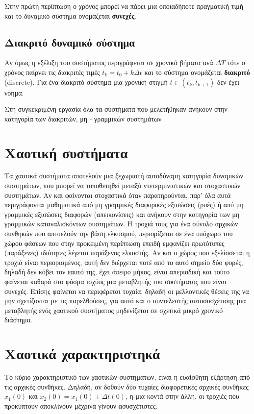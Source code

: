 Στην πρώτη περίπτωση ο χρόνος μπορεί να πάρει μια οποιαδήποτε πραγματική τιμή και το δυναμικό σύστημα ονομάζεται \textbf{συνεχές}.\cite{b2}

\subsection{Διακριτό δυναμικό σύστημα}
Αν όμως η εξέλιξη του συστήματος περιγράφεται σε χρονικά βήματα ανά $ΔT$ τότε ο χρόνος παίρνει τις διακριτές τιμές $t_k = t_0 + kΔt$ και το σύστημα ονομάζεται \textbf{διακριτό} (discrete). 
Για ένα διακριτό σύστημα μια χρονική στιγμή $t \in(t_k,t_{k+1}) $ δεν έχει νόημα.\cite{b2}



Στη συγκεκριμένη εργασία όλα τα συστήματα που μελετήθηκαν ανήκουν στην κατηγορία των διακριτών, μη - γραμμικών συστημάτων

\clearpage

\section{Χαοτική συστήματα}

Τα χαοτικά συστήματα αποτελούν μια ξεχωριστή αυτοδύναμη κατηγορία δυναμικών συστημάτων, που μπορεί να τοποθετηθεί μεταξύ ντετερμινιστικών και στοχαστικών συστημάτων. Αν και φαίνονται στοχαστικά όταν παρατηρούνται, παρ’ όλα αυτά περιγράφονται μαθηματικά από μη γραμμικές διαφορικές εξισώσεις (ροές) ή από μη
γραμμικές εξισώσεις διαφορών (απεικονίσεις) και ανήκουν στην κατηγορία των μη γραμμικών καταναλισκόντων συστημάτων. Η τροχιά τους για ένα σύνολο αρχικών συνθηκών που αποτελούν την βάση ελκυσμού, περιορίζεται σε ένα υπόχωρο του χώρου φάσεων που στην προκειμένη περίπτωση επειδή εμφανίζει πρωτότυπες (παράξενες) ιδιότητες λέγεται παράξενος ελκυστής. Αν και ο χώρος που εξελίσσεται η τροχιά είναι περιορισμένος, αυτή δεν διέρχεται ποτέ από το αυτό σημείο δύο φορές, δηλαδή δεν κόβει τον εαυτό της, έχει άπειρο μήκος, είναι απεριοδική και τούτο φαίνεται καθαρά στο φάσμα ισχύος μια μεταβλητής του συστήματος που είναι συνεχές. Επίσης φαίνεται να περιφέρεται τυχαία, δηλαδή οι μελλοντικές θέσεις της να μην σχετίζονται με τις παρελθούσες, για αυτό και ο συντελεστής αυτοσυσχέτισης μια μεταβλητής ενός χαοτικού συστήματος μηδενίζεται
σε σχετικά μικρό χρονικό διάστημα.\cite{b3}




\clearpage

\section{Χαοτικά χαρακτηριστηκά}
Το κύριο χαρακτηριστικό των χαοτικών συστημάτων, είναι η
ευαίσθητη εξάρτηση από τις αρχικές συνθήκες. Δηλαδή, αν δοθούν δύο τυχαίες διαφορετικές αρχικές συνθήκες $x_1(0)$ και $x_2(0) = x_1(0) + Δt(0) $, η μια κοντά στην άλλη, οι τροχιές που προκύπτουν αποκλίνουν μέχρινα γίνουν ασυσχέτιστες.

